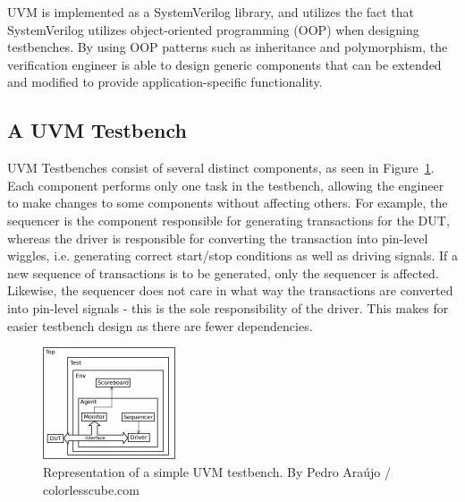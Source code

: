 \documentclass[conference]{IEEEtran}
\newcommand{\ducky}[1]{{\color{orange} Richard: #1}}
\begin{document}
UVM is implemented as a SystemVerilog library, and utilizes the fact that SystemVerilog utilizes object-oriented programming (OOP) when designing testbenches. By using OOP patterns such as inheritance and polymorphism, the verification engineer is able to design generic components that can be extended and modified to provide application-specific functionality. 

\subsection{A UVM Testbench}
UVM Testbenches consist of several distinct components, as seen in Figure~\ref{fig:uvm_testbench}. Each component performs only one task in the testbench, allowing the engineer to make changes to some components without affecting others. 
For example, the sequencer is the component responsible for generating transactions for the DUT, whereas the driver is responsible for converting the transaction into pin-level wiggles, i.e. generating correct start/stop conditions as well as driving signals. If a new sequence of transactions is to be generated, only the sequencer is affected. Likewise, the sequencer does not care in what way the transactions are converted into pin-level signals - this is the sole responsibility of the driver. This makes for easier testbench design as there are fewer dependencies. 

\begin{figure}
    \centering
    \includegraphics[width=0.35\textwidth]{uvm-tb_Pedro-Araujo.png}
    \caption{Representation of a simple UVM testbench. By Pedro Araújo / colorlesscube.com}
    \label{fig:uvm_testbench}
\end{figure}

\end{document}

